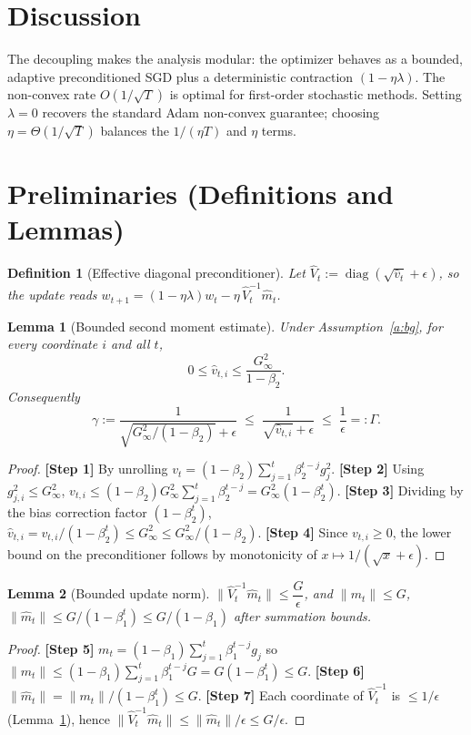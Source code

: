 \documentclass[11pt]{article}
\newtheorem{lemma}{Lemma}
\newtheorem{definition}{Definition}
\begin{document}
\section*{Discussion}
The decoupling makes the analysis modular: the optimizer behaves as a bounded,
adaptive preconditioned SGD plus a deterministic contraction $(1-\eta\lambda)$.
The non-convex rate $O(1/\sqrt T)$ is optimal for first-order stochastic methods.
Setting $\lambda=0$ recovers the standard Adam non-convex guarantee; choosing
$\eta=\Theta(1/\sqrt T)$ balances the $1/(\eta T)$ and $\eta$ terms.

\section*{Preliminaries (Definitions and Lemmas)}
\begin{definition}[Effective diagonal preconditioner]
Let $\hat V_t := \operatorname{diag}(\sqrt{\hat v_t}+\epsilon)$, so the update reads
$w_{t+1} = (1-\eta\lambda)w_t - \eta\,\hat V_t^{-1}\hat m_t$.
\end{definition}

\begin{lemma}[Bounded second moment estimate]\label{lem:vbound}
Under Assumption~\ref{a:bg}, for every coordinate $i$ and all $t$,
\[
0 \le \hat v_{t,i} \le \frac{G_\infty^2}{1-\beta_2}.
\]
Consequently
\[
\gamma := \frac{1}{\sqrt{G_\infty^2/(1-\beta_2)}+\epsilon}
\;\le\; \frac{1}{\sqrt{\hat v_{t,i}}+\epsilon}
\;\le\; \frac{1}{\epsilon} =: \Gamma.
\]
\end{lemma}
\begin{proof}
\textbf{[Step 1]} By unrolling $v_t=(1-\beta_2)\sum_{j=1}^t \beta_2^{t-j} g_j^2$.
\textbf{[Step 2]} Using $g_{j,i}^2 \le G_\infty^2$,
$v_{t,i}\le (1-\beta_2)G_\infty^2\sum_{j=1}^t\beta_2^{t-j}
= G_\infty^2(1-\beta_2^t)$.
\textbf{[Step 3]} Dividing by the bias correction factor $(1-\beta_2^t)$,
$\hat v_{t,i}=v_{t,i}/(1-\beta_2^t)\le G_\infty^2 \le G_\infty^2/(1-\beta_2)$.
\textbf{[Step 4]} Since $v_{t,i}\ge 0$, the lower bound on the preconditioner
follows by monotonicity of $x\mapsto 1/(\sqrt x+\epsilon)$.
\end{proof}

\begin{lemma}[Bounded update norm]\label{lem:upd}
$\|\hat V_t^{-1}\hat m_t\| \le \dfrac{G}{\epsilon}$, and
$\|m_t\|\le G$, $\|\hat m_t\|\le G/(1-\beta_1^t)\le G/(1-\beta_1)$ after summation bounds.
\end{lemma}
\begin{proof}
\textbf{[Step 5]} $m_t=(1-\beta_1)\sum_{j=1}^t\beta_1^{t-j}g_j$ so
$\|m_t\|\le(1-\beta_1)\sum_{j=1}^t\beta_1^{t-j}G = G(1-\beta_1^t)\le G$.
\textbf{[Step 6]} $\|\hat m_t\| = \|m_t\|/(1-\beta_1^t)\le G$.
\textbf{[Step 7]} Each coordinate of $\hat V_t^{-1}$ is $\le 1/\epsilon$
(Lemma~\ref{lem:vbound}), hence
$\|\hat V_t^{-1}\hat m_t\|\le \|\hat m_t\|/\epsilon \le G/\epsilon$.
\end{proof}
\end{document}

